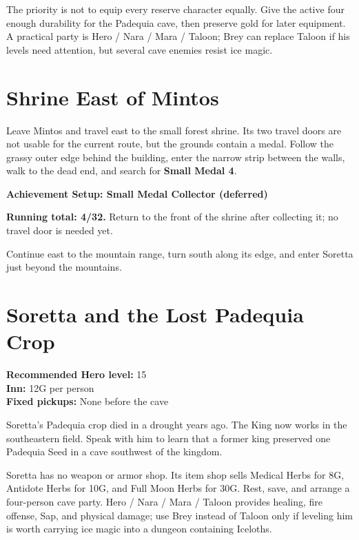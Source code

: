 \documentclass[
  american,
  10pt,
  letterpaper,
  oneside,
  open=any]{scrreprt}
\begin{document}
The priority is not to equip every reserve character equally. Give the
active four enough durability for the Padequia cave, then preserve gold
for later equipment. A practical party is Hero / Nara / Mara / Taloon;
Brey can replace Taloon if his levels need attention, but several cave
enemies resist ice magic.

\section{Shrine East of Mintos}\label{shrine-east-of-mintos}

Leave Mintos and travel east to the small forest shrine. Its two travel
doors are not usable for the current route, but the grounds contain a
medal. Follow the grassy outer edge behind the building, enter the
narrow strip between the walls, walk to the dead end, and search for
\textbf{Small Medal 4}.

\begin{achievementsetup}

\textbf{Achievement Setup: Small Medal Collector (deferred)}

\textbf{Running total: 4/32.} Return to the front of the shrine after
collecting it; no travel door is needed yet.

\end{achievementsetup}

Continue east to the mountain range, turn south along its edge, and
enter Soretta just beyond the mountains.

\section{Soretta and the Lost Padequia
Crop}\label{soretta-and-the-lost-padequia-crop}

\textbf{Recommended Hero level:} 15\\
\textbf{Inn:} 12G per person\\
\textbf{Fixed pickups:} None before the cave

Soretta's Padequia crop died in a drought years ago. The King now works
in the southeastern field. Speak with him to learn that a former king
preserved one Padequia Seed in a cave southwest of the kingdom.

Soretta has no weapon or armor shop. Its item shop sells Medical Herbs
for 8G, Antidote Herbs for 10G, and Full Moon Herbs for 30G. Rest, save,
and arrange a four-person cave party. Hero / Nara / Mara / Taloon
provides healing, fire offense, Sap, and physical damage; use Brey
instead of Taloon only if leveling him is worth carrying ice magic into
a dungeon containing Iceloths.
\end{document}
